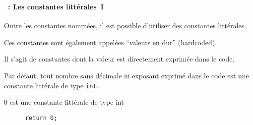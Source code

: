 \begin{frame}[containsverbatim]
  \frametitle{\secname}
  \framesubtitle{\subsecname~: Les constantes littérales~I} 

  Outre les constantes nommées, il est possible d'utiliser des constantes littérales.
  \vspace{0.3cm}
  \par
  Ces constantes sont également appelées ``valeurs en dur'' (hardcoded).
  \vspace{0.3cm}
  \par
  Il s'agit de constantes dont la valeur est directement exprimée dans le code.
  \vspace{0.3cm}
  \par
  Par défaut, tout nombre sans décimale ni exposant exprimé dans le code est une constante littérale de type \texttt{int}.
  \begin{exampleblock}{0 est une constante littérale de type int}
    \begin{verbatim}
      return 0;\end{verbatim}
  \end{exampleblock}
\end{frame}

